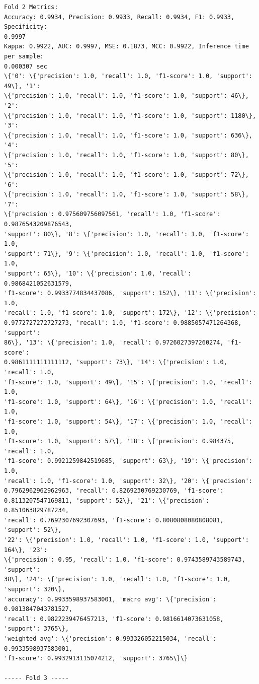 \documentclass[11pt]{article}
\begin{document}
    \begin{Verbatim}[commandchars=\\\{\}]
Fold 2 Metrics:
Accuracy: 0.9934, Precision: 0.9933, Recall: 0.9934, F1: 0.9933, Specificity:
0.9997
Kappa: 0.9922, AUC: 0.9997, MSE: 0.1873, MCC: 0.9922, Inference time per sample:
0.000307 sec
\{'0': \{'precision': 1.0, 'recall': 1.0, 'f1-score': 1.0, 'support': 49\}, '1':
\{'precision': 1.0, 'recall': 1.0, 'f1-score': 1.0, 'support': 46\}, '2':
\{'precision': 1.0, 'recall': 1.0, 'f1-score': 1.0, 'support': 1180\}, '3':
\{'precision': 1.0, 'recall': 1.0, 'f1-score': 1.0, 'support': 636\}, '4':
\{'precision': 1.0, 'recall': 1.0, 'f1-score': 1.0, 'support': 80\}, '5':
\{'precision': 1.0, 'recall': 1.0, 'f1-score': 1.0, 'support': 72\}, '6':
\{'precision': 1.0, 'recall': 1.0, 'f1-score': 1.0, 'support': 58\}, '7':
\{'precision': 0.975609756097561, 'recall': 1.0, 'f1-score': 0.9876543209876543,
'support': 80\}, '8': \{'precision': 1.0, 'recall': 1.0, 'f1-score': 1.0,
'support': 71\}, '9': \{'precision': 1.0, 'recall': 1.0, 'f1-score': 1.0,
'support': 65\}, '10': \{'precision': 1.0, 'recall': 0.9868421052631579,
'f1-score': 0.9933774834437086, 'support': 152\}, '11': \{'precision': 1.0,
'recall': 1.0, 'f1-score': 1.0, 'support': 172\}, '12': \{'precision':
0.9772727272727273, 'recall': 1.0, 'f1-score': 0.9885057471264368, 'support':
86\}, '13': \{'precision': 1.0, 'recall': 0.9726027397260274, 'f1-score':
0.9861111111111112, 'support': 73\}, '14': \{'precision': 1.0, 'recall': 1.0,
'f1-score': 1.0, 'support': 49\}, '15': \{'precision': 1.0, 'recall': 1.0,
'f1-score': 1.0, 'support': 64\}, '16': \{'precision': 1.0, 'recall': 1.0,
'f1-score': 1.0, 'support': 54\}, '17': \{'precision': 1.0, 'recall': 1.0,
'f1-score': 1.0, 'support': 57\}, '18': \{'precision': 0.984375, 'recall': 1.0,
'f1-score': 0.9921259842519685, 'support': 63\}, '19': \{'precision': 1.0,
'recall': 1.0, 'f1-score': 1.0, 'support': 32\}, '20': \{'precision':
0.7962962962962963, 'recall': 0.8269230769230769, 'f1-score':
0.8113207547169811, 'support': 52\}, '21': \{'precision': 0.851063829787234,
'recall': 0.7692307692307693, 'f1-score': 0.8080808080808081, 'support': 52\},
'22': \{'precision': 1.0, 'recall': 1.0, 'f1-score': 1.0, 'support': 164\}, '23':
\{'precision': 0.95, 'recall': 1.0, 'f1-score': 0.9743589743589743, 'support':
38\}, '24': \{'precision': 1.0, 'recall': 1.0, 'f1-score': 1.0, 'support': 320\},
'accuracy': 0.9933598937583001, 'macro avg': \{'precision': 0.9813847043781527,
'recall': 0.9822239476457213, 'f1-score': 0.9816614073631058, 'support': 3765\},
'weighted avg': \{'precision': 0.993326052215034, 'recall': 0.9933598937583001,
'f1-score': 0.9932913115074212, 'support': 3765\}\}

----- Fold 3 -----

    \end{Verbatim}
\end{document}

